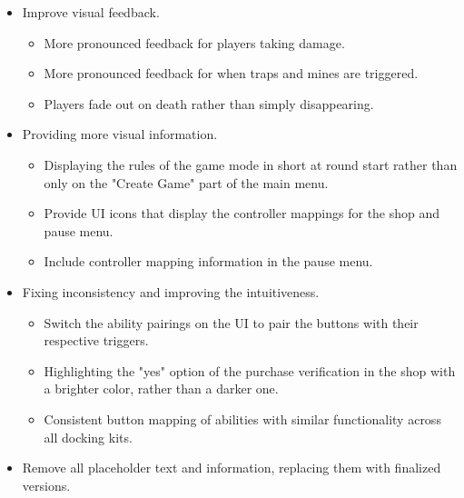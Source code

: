\begin{itemize}
    \item Improve visual feedback.
    \begin{itemize}
        \item More pronounced feedback for players taking damage.
        \item More pronounced feedback for when traps and mines are triggered. 
        \item Players fade out on death rather than simply disappearing.
    \end{itemize}
    
    \item Providing more visual information. 
    \begin{itemize}
        \item Displaying the rules of the game mode in short at round start rather than only on the "Create Game" part of the main menu.
        \item Provide UI icons that display the controller mappings for the shop and pause menu.
        \item Include controller mapping information in the pause menu. 
    \end{itemize}
    
    \item Fixing inconsistency and improving the intuitiveness.
    \begin{itemize}
        \item Switch the ability pairings on the UI to pair the buttons with their respective triggers.
        \item Highlighting the "yes" option of the purchase verification in the shop with a brighter color, rather than a darker one. 
        \item Consistent button mapping of abilities with similar functionality across all docking kits. 
    \end{itemize}
    
    \item Remove all placeholder text and information, replacing them with finalized versions. 
\end{itemize}